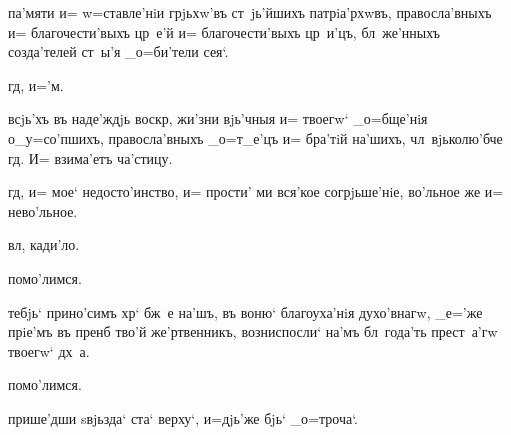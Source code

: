  па'мяти и= w=ставле'нiи грjьхw'въ ст~jь'йшихъ 
патрiа'рхwвъ, правосла'вныхъ и= благочести'выхъ цр~е'й и= 
благочести'выхъ цр~и'цъ, бл~же'нныхъ созда'телей ст~ы'я 
_о=би'тели сея`.

                   
гд, и='м.


 всjь'хъ въ наде'ждjь воскр, жи'зни вjь'чныя и= 
твоегw` _о=бще'нiя о_у=со'пшихъ, правосла'вныхъ _о=т_е'цъ 
и= бра'тiй на'шихъ, чл~вjьколю'бче гд. И= взима'етъ 
ча'стицу.

   гд, и= мое` 
недосто'инство, и= прости' ми вся'кое согрjьше'нiе, 
во'льное же и= нево'льное.




 вл, кади'ло.

     помо'лимся.


 тебjь` прино'симъ хр` бж~е на'шъ, въ воню` 
благоуха'нiя духо'внагw, _е='же прiе'мъ въ пренб 
тво'й же'ртвенникъ, возниспосли` на'мъ бл~года'ть 
прест~а'гw твоегw` дх~а.

  помо'лимся.


 прише'дши sвjьзда` ста` верху`, и=дjь'же бjь` 
_о=троча`.

